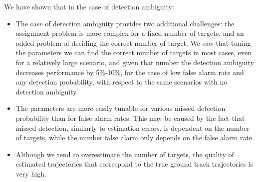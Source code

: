 We have shown that in the case of detection ambiguity:
\begin{itemize}
\item The case of detection ambiguity provides two additional challenges: the assignment problem is more complex for a fixed number of targets, and an added problem of deciding the correct number of target. We saw that tuning the parameters we can find the correct number of targets in most cases, even for a relatively large scenario, and given that number the detection ambiguity decreases performance by 5\%-10\%,  for the case of low false alarm rate and any detection probability, with respect to the same scenarios with no detection ambiguity.
\item The parameters are more easily tunable for various missed detection probability than for false alarm rates. This may be caused by the fact that missed detection, similarly to estimation errors, is dependent on the number of targets, while the number false alarm only depends on the false alarm rate. 
\item Although we tend to overestimate the number of targets, the quality of estimated trajectories that correspond to the true ground track trajectories is very high. 
\end{itemize}